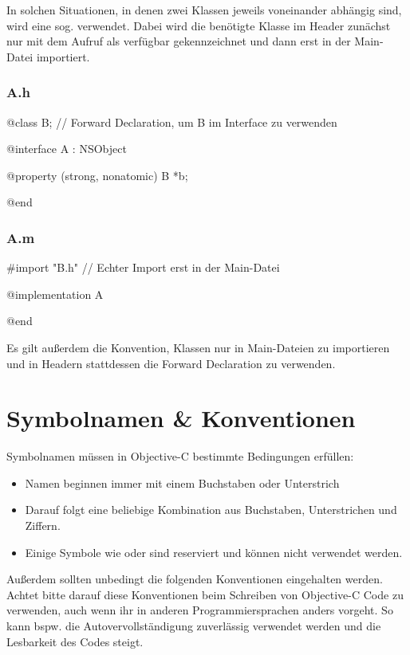 \documentclass[parskip=half, final]{scrreprt}
\begin{document}
In solchen Situationen, in denen zwei Klassen jeweils voneinander abhängig sind, wird eine sog.  verwendet. Dabei wird die benötigte Klasse im Header zunächst nur mit dem Aufruf  als verfügbar gekennzeichnet und dann erst in der Main-Datei importiert.

\subsubsection{A.h}
\begin{objclst}
@class B; // Forward Declaration, um B im Interface zu verwenden

@interface A : NSObject

@property (strong, nonatomic) B *b;

@end
\end{objclst}
\subsubsection{A.m}
\begin{objclst}
#import "B.h" // Echter Import erst in der Main-Datei

@implementation A

@end
\end{objclst}

Es gilt außerdem die Konvention, Klassen nur in Main-Dateien zu importieren und in Headern stattdessen die Forward Declaration zu verwenden.

\section{Symbolnamen \& Konventionen}\label{sec:konventionen}

Symbolnamen müssen in Objective-C bestimmte Bedingungen erfüllen:

\begin{itemize}
\item Namen beginnen immer mit einem Buchstaben oder Unterstrich \objc{_}
\item Darauf folgt eine beliebige Kombination aus Buchstaben, Unterstrichen und Ziffern.
\item Einige Symbole wie  oder  sind reserviert und können nicht verwendet werden.
\end{itemize}

Außerdem sollten unbedingt die folgenden Konventionen eingehalten werden. Achtet bitte darauf diese Konventionen beim Schreiben von Objective-C Code zu verwenden, auch wenn ihr in anderen Programmiersprachen anders vorgeht. So kann bspw. die Autovervollständigung zuverlässig verwendet werden und die Lesbarkeit des Codes steigt.
\end{document}
